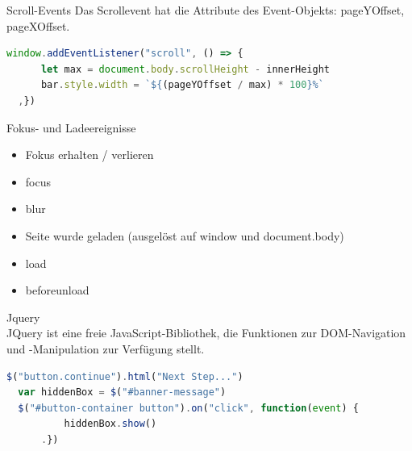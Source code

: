   \begin{definition}{Scroll-Events}
  Das Scrollevent hat die Attribute des Event-Objekts: pageYOffset, pageXOffset.
  
  \begin{lstlisting}[language=JavaScript, style=basesmol]
  window.addEventListener("scroll", () => {
      let max = document.body.scrollHeight - innerHeight
      bar.style.width = `${(pageYOffset / max) * 100}%`
  ,})
  \end{lstlisting}
\end{definition}
  
  Fokus- und Ladeereignisse
  
  \begin{itemize}
    \item Fokus erhalten / verlieren
    \item focus
    \item blur
    \item Seite wurde geladen (ausgelöst auf window und document.body)
    \item load
    \item beforeunload
  \end{itemize}
  
  Jquery\\
  JQuery ist eine freie JavaScript-Bibliothek, die Funktionen zur DOM-Navigation und -Manipulation zur Verfügung stellt.
  
  \begin{lstlisting}[language=JavaScript, style=basesmol]
  $("button.continue").html("Next Step...")
  var hiddenBox = $("#banner-message")
  $("#button-container button").on("click", function(event) {
          hiddenBox.show()
      .})
  \end{lstlisting}
  
